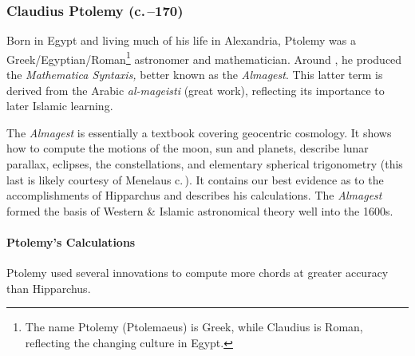 \subsubsection*{Claudius Ptolemy (c.\,--170)}%

Born in Egypt and living much of his life in Alexandria, Ptolemy was a Greek/Egyptian/Roman\footnote{%
	The name Ptolemy (Ptolemaeus) is Greek, while Claudius is Roman, reflecting the changing culture in Egypt.%
}
astronomer and mathematician. Around , he produced the \emph{Mathematica Syntaxis,} better known as the \emph{Almagest}. This latter term is derived from the Arabic \emph{al-mageisti} (great work), reflecting its importance to later Islamic learning.\smallbreak
 
The \emph{Almagest} is essentially a textbook covering geocentric cosmology. It shows how to compute the motions of the moon, sun and planets, describe lunar parallax, eclipses, the constellations, and elementary spherical trigonometry (this last is likely courtesy of Menelaus c.\,). It contains our best evidence as to the accomplishments of Hipparchus and describes his calculations. The \emph{Almagest} formed the basis of Western \& Islamic astronomical theory well into the 1600s.



\paragraph{Ptolemy's Calculations}

Ptolemy used several innovations to compute more chords at greater accuracy than Hipparchus.


